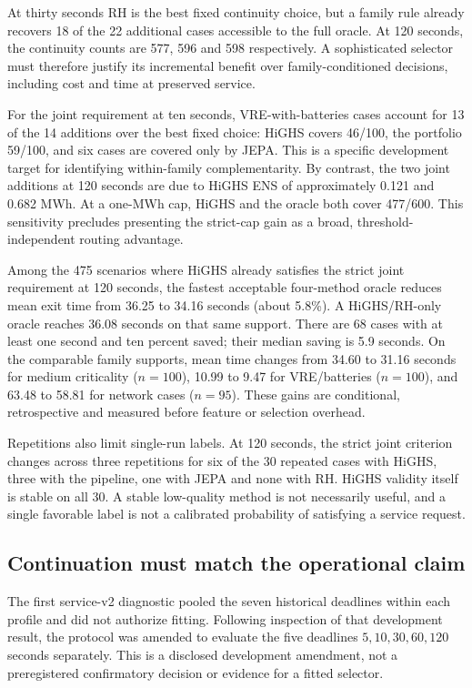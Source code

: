 At thirty seconds RH is the best fixed continuity choice, but a family rule
already recovers 18 of the 22 additional cases accessible to the full oracle.
At 120 seconds, the continuity counts are 577, 596 and 598 respectively.
A sophisticated selector must therefore justify its incremental benefit
over family-conditioned decisions, including cost and time at preserved service.

For the joint requirement at ten seconds, VRE-with-batteries cases account
for 13 of the 14 additions over the best fixed choice: HiGHS covers 46/100,
the portfolio 59/100, and six cases are covered only by JEPA. This is a
specific development target for identifying within-family complementarity.
By contrast, the two joint additions at 120 seconds are due to HiGHS ENS
of approximately 0.121 and 0.682 MWh. At a one-MWh cap, HiGHS and the oracle
both cover 477/600. This sensitivity precludes presenting the strict-cap
gain as a broad, threshold-independent routing advantage.

Among the 475 scenarios where HiGHS already satisfies the strict joint
requirement at 120 seconds, the fastest acceptable four-method oracle reduces
mean exit time from 36.25 to 34.16 seconds (about 5.8\%). A HiGHS/RH-only
oracle reaches 36.08 seconds on that same support. There are 68 cases with
at least one second and ten percent saved; their median saving is 5.9 seconds.
On the comparable family supports, mean time changes from 34.60 to 31.16
seconds for medium criticality ($n=100$), 10.99 to 9.47 for VRE/batteries
($n=100$), and 63.48 to 58.81 for network cases ($n=95$). These gains are
conditional, retrospective and measured before feature or selection overhead.

Repetitions also limit single-run labels. At 120 seconds, the strict joint
criterion changes across three repetitions for six of the 30 repeated cases
with HiGHS, three with the pipeline, one with JEPA and none with RH. HiGHS
validity itself is stable on all 30. A stable low-quality method is not
necessarily useful, and a single favorable label is not a calibrated
probability of satisfying a service request.

\subsection{Continuation must match the operational claim}
The first service-v2 diagnostic pooled the seven historical deadlines within
each profile and did not authorize fitting. Following inspection of that
development result, the protocol was amended to evaluate the five deadlines
$5,10,30,60,120$ seconds separately. This is a disclosed development amendment,
not a preregistered confirmatory decision or evidence for a fitted selector.

